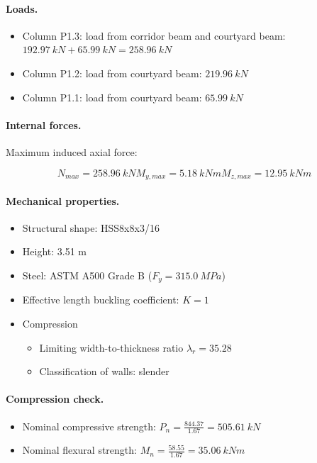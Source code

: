 \paragraph{Loads.}

\begin{itemize}
\item Column P1.3: load from corridor beam and courtyard beam: $192.97\ kN + 65.99\ kN= 258.96\ kN$
\item Column P1.2: load from courtyard beam: $219.96\ kN$
\item Column P1.1: load from courtyard beam: $65.99\ kN$
\end{itemize}

\paragraph{Internal forces.}

\noindent Maximum induced axial force:

\begin{equation}
  N_{max}= 258.96\ kN
  M_{y,max}= 5.18\ kN m
  M_{z,max}= 12.95\ kN m
\end{equation}

\paragraph{Mechanical properties.}

\begin{itemize}
\item Structural shape: HSS8x8x3/16
\item Height: 3.51 m
\item Steel: ASTM A500 Grade B ($F_y= 315.0\ MPa$)
\item Effective length buckling coefficient: $K= 1$
\item Compression
\begin{itemize}
  \item Limiting width-to-thickness ratio $\lambda_r= 35.28$
  \item Classification of walls: slender
\end{itemize}
\end{itemize}

\paragraph{Compression check.}

\begin{itemize}
\item Nominal compressive strength: $P_n= \frac{844.37}{1.67}= 505.61\ kN$
\item Nominal flexural strength: $M_n= \frac{58.55}{1.67}= 35.06\ kN m$
\end{itemize}

